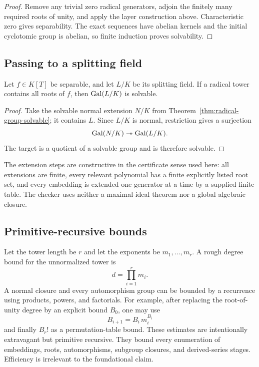 \begin{proof}
Remove any trivial zero radical generators, adjoin the finitely many required
roots of unity, and apply the layer construction above.  Characteristic zero
gives separability.  The exact sequences have abelian kernels and the initial
cyclotomic group is abelian, so finite induction proves solvability.
\end{proof}

\subsection{Passing to a splitting field}

\begin{corollary}
\label{cor:split-rad-solvable}
Let $f\in K[T]$ be separable, and let $L/K$ be its splitting field.  If a
radical tower contains all roots of $f$, then $\operatorname{Gal}(L/K)$ is solvable.
\end{corollary}

\begin{proof}
Take the solvable normal extension $N/K$ from
Theorem~\ref{thm:radical-group-solvable}; it contains $L$.  Since $L/K$ is
normal, restriction gives a surjection
\[
 \operatorname{Gal}(N/K)\twoheadrightarrow\operatorname{Gal}(L/K).
\]
The target is a quotient of a solvable group and is therefore solvable.
\end{proof}

The extension steps are constructive in the certificate sense used here: all
extensions are finite, every relevant polynomial has a finite explicitly
listed root set, and every embedding is extended one generator at a time by a
supplied finite table.  The checker uses neither a maximal-ideal theorem nor a
global algebraic closure.

\subsection{Primitive-recursive bounds}

Let the tower length be $r$ and let the exponents be
$m_1,\ldots,m_r$.  A rough degree bound for the unnormalized tower is
\[
 d=\prod_{i=1}^{r}m_i.
\]
A normal closure and every automorphism group can be bounded by a recurrence
using products, powers, and factorials.  For example, after replacing the
root-of-unity degree by an explicit bound $B_0$, one may use
\[
 B_{i+1}=B_i\,m_i^{B_i}
\]
and finally $B_r!$ as a permutation-table bound.  These estimates are
intentionally extravagant but primitive recursive.  They bound every
enumeration of embeddings, roots, automorphisms, subgroup closures, and
derived-series stages.  Efficiency is irrelevant to the foundational claim.
